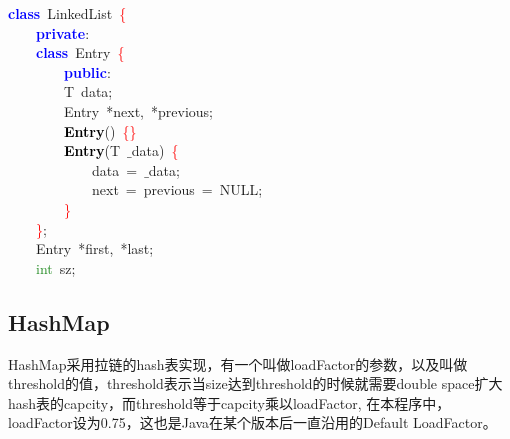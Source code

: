 \begin{center}\begin{minipage}{120mm}
\noindent
\mbox{}\textbf{\textcolor{Blue}{class}}\ \textcolor{TealBlue}{LinkedList}\ \textcolor{Red}{\{} \\
\mbox{}\ \ \ \ \textbf{\textcolor{Blue}{private}}\textcolor{BrickRed}{:} \\
\mbox{}\ \ \ \ \textbf{\textcolor{Blue}{class}}\ \textcolor{TealBlue}{Entry}\ \textcolor{Red}{\{} \\
\mbox{}\ \ \ \ \ \ \ \ \textbf{\textcolor{Blue}{public}}\textcolor{BrickRed}{:} \\
\mbox{}\ \ \ \ \ \ \ \ \textcolor{TealBlue}{T}\ data\textcolor{BrickRed}{;} \\
\mbox{}\ \ \ \ \ \ \ \ \textcolor{TealBlue}{Entry}\ \textcolor{BrickRed}{*}next\textcolor{BrickRed}{,}\ \textcolor{BrickRed}{*}previous\textcolor{BrickRed}{;} \\
\mbox{}\ \ \ \ \ \ \ \ \textbf{\textcolor{Black}{Entry}}\textcolor{BrickRed}{()}\ \textcolor{Red}{\{\}} \\
\mbox{}\ \ \ \ \ \ \ \ \textbf{\textcolor{Black}{Entry}}\textcolor{BrickRed}{(}\textcolor{TealBlue}{T}\ $\_$data\textcolor{BrickRed}{)}\ \textcolor{Red}{\{} \\
\mbox{}\ \ \ \ \ \ \ \ \ \ \ \ data\ \textcolor{BrickRed}{=}\ $\_$data\textcolor{BrickRed}{;} \\
\mbox{}\ \ \ \ \ \ \ \ \ \ \ \ next\ \textcolor{BrickRed}{=}\ previous\ \textcolor{BrickRed}{=}\ NULL\textcolor{BrickRed}{;} \\
\mbox{}\ \ \ \ \ \ \ \ \textcolor{Red}{\}} \\
\mbox{}\ \ \ \ \textcolor{Red}{\}}\textcolor{BrickRed}{;} \\
\mbox{}\ \ \ \ \textcolor{TealBlue}{Entry}\ \textcolor{BrickRed}{*}first\textcolor{BrickRed}{,}\ \textcolor{BrickRed}{*}last\textcolor{BrickRed}{;} \\
\mbox{}\ \ \ \ \textcolor{ForestGreen}{int}\ sz\textcolor{BrickRed}{;} 
\end{minipage}\end{center}

\subsection{HashMap}
HashMap采用拉链的hash表实现，有一个叫做loadFactor的参数，以及叫做threshold的值，threshold表示当size达到threshold的时候就需要double space扩大hash表的capcity，而threshold等于capcity乘以loadFactor, 在本程序中，loadFactor设为0.75，这也是Java在某个版本后一直沿用的Default LoadFactor。


